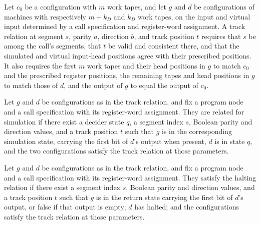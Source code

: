 \begin{definition}
\label{Complexity.LogProg.TrackRel}
\leanok
{}
Let $c_0$ be a configuration with $m$ work tapes, and let $g$ and $d$ be configurations
of machines with respectively $m+k_D$ and $k_D$ work tapes, on the input and virtual
input determined by a call specification and register-word assignment. A track relation
at segment $s$, parity $a$, direction $b$, and track position $t$ requires that $s$ be
among the call's segments, that $t$ be valid and consistent there, and that the
simulated and virtual input-head positions agree with their prescribed positions. It
also requires the first $m$ work tapes and their head positions in $g$ to match $c_0$
and the prescribed register positions, the remaining tapes and head positions in $g$ to
match those of $d$, and the output of $g$ to equal the output of $c_0$.
\end{definition}

\begin{definition}
\label{Complexity.LogProg.SimRel}
\leanok
{}
Let $g$ and $d$ be configurations as in the track relation, and fix a program node and a
call specification with its register-word assignment. They are related for simulation if
there exist a decider state $q$, a segment index $s$, Boolean parity and direction
values, and a track position $t$ such that $g$ is in the corresponding simulation state,
carrying the first bit of $d$'s output when present, $d$ is in state $q$, and the two
configurations satisfy the track relation at those parameters.
\end{definition}

\begin{definition}
\label{Complexity.LogProg.HaltRel}
\leanok
{}
Let $g$ and $d$ be configurations as in the track relation, and fix a program node and a
call specification with its register-word assignment. They satisfy the halting relation
if there exist a segment index $s$, Boolean parity and direction values, and a track
position $t$ such that $g$ is in the return state carrying the first bit of $d$'s
output, or false if that output is empty; $d$ has halted; and the configurations satisfy
the track relation at those parameters.
\end{definition}

